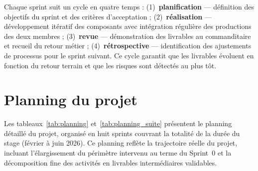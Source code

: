 \documentclass[12pt,a4paper]{report}
\begin{document}
Chaque sprint suit un cycle en quatre temps : (1)~\textbf{planification} --- définition des objectifs du sprint et des critères d'acceptation ; (2)~\textbf{réalisation} --- développement itératif des composants avec intégration régulière des productions des deux membres ; (3)~\textbf{revue} --- démonstration des livrables au commanditaire et recueil du retour métier ; (4)~\textbf{rétrospective} --- identification des ajustements de processus pour le sprint suivant. Ce cycle garantit que les livrables évoluent en fonction du retour terrain et que les risques sont détectés au plus tôt.

\clearpage
\section{Planning du projet}

Les tableaux~\ref{tab:planning} et~\ref{tab:planning_suite} présentent le planning détaillé du projet, organisé en huit sprints couvrant la totalité de la durée du stage (février à juin 2026). Ce planning reflète la trajectoire réelle du projet, incluant l'élargissement du périmètre intervenu au terme du Sprint~0 et la décomposition fine des activités en livrables intermédiaires validables.
\end{document}
